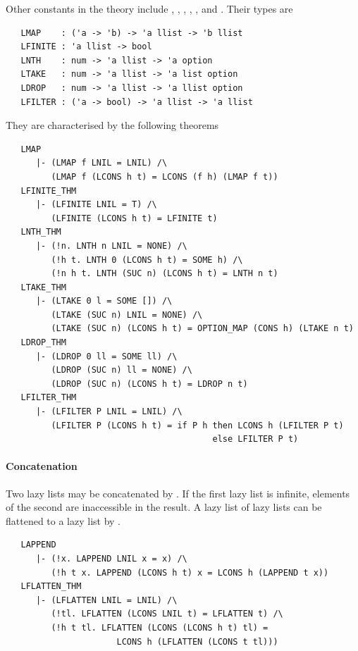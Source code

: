 Other constants in the theory  include , ,
, , , and . Their types are
%
\begin{hol}
\begin{verbatim}
   LMAP    : ('a -> 'b) -> 'a llist -> 'b llist
   LFINITE : 'a llist -> bool
   LNTH    : num -> 'a llist -> 'a option
   LTAKE   : num -> 'a llist -> 'a list option
   LDROP   : num -> 'a llist -> 'a llist option
   LFILTER : ('a -> bool) -> 'a llist -> 'a llist
\end{verbatim}
\end{hol}
They are characterised by the following theorems
\begin{hol}
\begin{verbatim}
   LMAP
      |- (LMAP f LNIL = LNIL) /\
         (LMAP f (LCONS h t) = LCONS (f h) (LMAP f t))
   LFINITE_THM
      |- (LFINITE LNIL = T) /\
         (LFINITE (LCONS h t) = LFINITE t)
   LNTH_THM
      |- (!n. LNTH n LNIL = NONE) /\
         (!h t. LNTH 0 (LCONS h t) = SOME h) /\
         (!n h t. LNTH (SUC n) (LCONS h t) = LNTH n t)
   LTAKE_THM
      |- (LTAKE 0 l = SOME []) /\
         (LTAKE (SUC n) LNIL = NONE) /\
         (LTAKE (SUC n) (LCONS h t) = OPTION_MAP (CONS h) (LTAKE n t)
   LDROP_THM
      |- (LDROP 0 ll = SOME ll) /\
         (LDROP (SUC n) ll = NONE) /\
         (LDROP (SUC n) (LCONS h t) = LDROP n t)
   LFILTER_THM
      |- (LFILTER P LNIL = LNIL) /\
         (LFILTER P (LCONS h t) = if P h then LCONS h (LFILTER P t)
                                         else LFILTER P t)
\end{verbatim}
\end{hol}

\paragraph{Concatenation}

Two lazy lists may be concatenated by . If the first lazy
list is infinite, elements of the second are inaccessible in the
result.  A lazy list of lazy lists can be flattened to a lazy list by
\ml{LFLATTEN}.
\begin{hol}\begin{verbatim}
   LAPPEND
      |- (!x. LAPPEND LNIL x = x) /\
         (!h t x. LAPPEND (LCONS h t) x = LCONS h (LAPPEND t x))
   LFLATTEN_THM
      |- (LFLATTEN LNIL = LNIL) /\
         (!tl. LFLATTEN (LCONS LNIL t) = LFLATTEN t) /\
         (!h t tl. LFLATTEN (LCONS (LCONS h t) tl) =
                      LCONS h (LFLATTEN (LCONS t tl)))
\end{verbatim}\end{hol}

